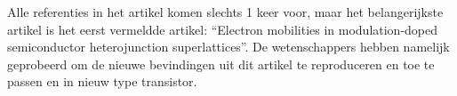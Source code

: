 \documentclass[11pt]{article}
\begin{document}
Alle referenties in het artikel komen slechts 1 keer voor, maar het belangerijkste artikel is het eerst vermeldde artikel: ``Electron mobilities in modulation-doped semiconductor heterojunction superlattices''. De wetenschappers hebben namelijk geprobeerd om de nieuwe bevindingen uit dit artikel te reproduceren en toe te passen en in nieuw type transistor.

\appendix




\end{document}
